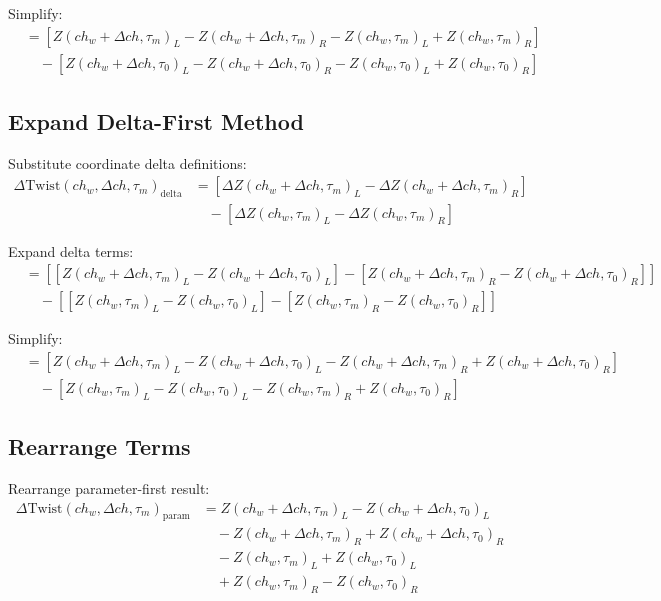 \documentclass{article}
\begin{document}
Simplify:
\begin{align}
&= [Z(ch_w + \Delta ch, \tau_m)_L - Z(ch_w + \Delta ch, \tau_m)_R - Z(ch_w, \tau_m)_L + Z(ch_w, \tau_m)_R] \nonumber \\
&\quad - [Z(ch_w + \Delta ch, \tau_0)_L - Z(ch_w + \Delta ch, \tau_0)_R - Z(ch_w, \tau_0)_L + Z(ch_w, \tau_0)_R]
\end{align}

\subsection{Expand Delta-First Method}
Substitute coordinate delta definitions:
\begin{align}
\Delta\text{Twist}(ch_w, \Delta ch, \tau_m)_{\text{delta}} &= [\Delta Z(ch_w + \Delta ch, \tau_m)_L - \Delta Z(ch_w + \Delta ch, \tau_m)_R] \nonumber \\
&\quad - [\Delta Z(ch_w, \tau_m)_L - \Delta Z(ch_w, \tau_m)_R]
\end{align}

Expand delta terms:
\begin{align}
&= [[Z(ch_w + \Delta ch, \tau_m)_L - Z(ch_w + \Delta ch, \tau_0)_L] - [Z(ch_w + \Delta ch, \tau_m)_R - Z(ch_w + \Delta ch, \tau_0)_R]] \nonumber \\
&\quad - [[Z(ch_w, \tau_m)_L - Z(ch_w, \tau_0)_L] - [Z(ch_w, \tau_m)_R - Z(ch_w, \tau_0)_R]]
\end{align}

Simplify:
\begin{align}
&= [Z(ch_w + \Delta ch, \tau_m)_L - Z(ch_w + \Delta ch, \tau_0)_L - Z(ch_w + \Delta ch, \tau_m)_R + Z(ch_w + \Delta ch, \tau_0)_R] \nonumber \\
&\quad - [Z(ch_w, \tau_m)_L - Z(ch_w, \tau_0)_L - Z(ch_w, \tau_m)_R + Z(ch_w, \tau_0)_R]
\end{align}

\subsection{Rearrange Terms}
Rearrange parameter-first result:
\begin{align}
\Delta\text{Twist}(ch_w, \Delta ch, \tau_m)_{\text{param}} &= Z(ch_w + \Delta ch, \tau_m)_L - Z(ch_w + \Delta ch, \tau_0)_L \nonumber \\
&\quad - Z(ch_w + \Delta ch, \tau_m)_R + Z(ch_w + \Delta ch, \tau_0)_R \nonumber \\
&\quad - Z(ch_w, \tau_m)_L + Z(ch_w, \tau_0)_L \nonumber \\
&\quad + Z(ch_w, \tau_m)_R - Z(ch_w, \tau_0)_R
\end{align}
\end{document}
